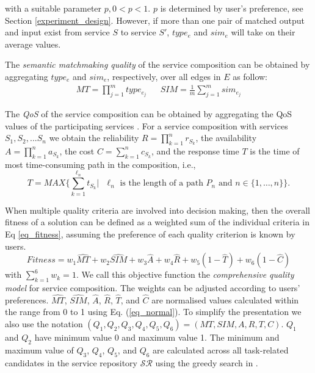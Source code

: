 \documentclass{llncs}
\begin{document}
\noindent with a suitable parameter $p, 0<p< 1$. $p$ is determined by user's preference, see Section \ref{experiment_design}. However, if more than one pair of matched output and input exist from service $S$ to service $S'$, $type_e$ and $sim_e$ will take on their average values.

The \emph{semantic matchmaking quality} of the service composition can be obtained by aggregating $type_e$ and $sim_e$, respectively, over all edges in $E$ as follow:
\begin{align*}
MT {=} \prod_{j=1}^{m} type_ {e_{j}}
&&
SIM {=} \frac{1}{m}\sum_{j=1}^m sim_ {e_{j}}
\end{align*}


The \emph{QoS} of the service composition can be obtained by aggregating the QoS values of the participating services \cite{ma2015hybrid}. For a service composition with services $ S_1, S_2, ... S_n$ we obtain the reliability $R=\prod\limits^n_{k=1}r_{S_k}$, the availability $A=\prod\limits^n_{k=1}a_{S_k}$, the cost $C=\sum\limits^n_{k=1}c_{S_k}$, and the response time $T$ is the time of most time-consuming path in the composition, i.e., $$T = MAX \{\sum\limits^{\ell_n}_{k=1}t_{S_k} | \text{ $\ell_n$ is the length of a path $P_n$ and $n\in\{1,\ldots,n\}$}\}.$$

\noindent When multiple quality criteria are involved into decision making, then the overall fitness of a solution can be defined as a weighted sum of the individual criteria in Eq \ref{eq_fitness}, assuming the preference of each quality criterion is known by users. 
\begin{equation}
\label{eq_fitness}
Fitness = w_1 \hat{MT} + w_2 \hat{SIM} + w_3 \hat{A} + w_4 \hat{R} + w_5(1 - \hat{T}) + w_6(1 - \hat{C})
\end{equation}
\noindent with $\sum_{k=1}^{6} w_k= 1$. We call this objective function the \emph{comprehensive quality model} for service composition.
The weights can be adjusted according to users' preferences. $\hat{MT}$, $\hat{SIM}$, $\hat{A}$, $\hat{R}$, $\hat{T}$, and $\hat{C}$ are normalised values calculated within the range from 0 to 1 using Eq. (\ref{eq_normal}). To simplify the presentation we also use the notation $(Q_1,Q_2,Q_3,Q_4,Q_5,Q_6) = (MT,SIM,A,R,T,C)$. $Q_1$ and $Q_2$ have minimum value 0 and maximum value 1. The minimum and maximum value of $Q_3$, $Q_4$, $Q_5$, and $Q_6$ are calculated across all task-related candidates in the service repository $\mathcal{SR}$ using the greedy search in \cite{ma2015hybrid,da2016genetic}.
\end{document}
